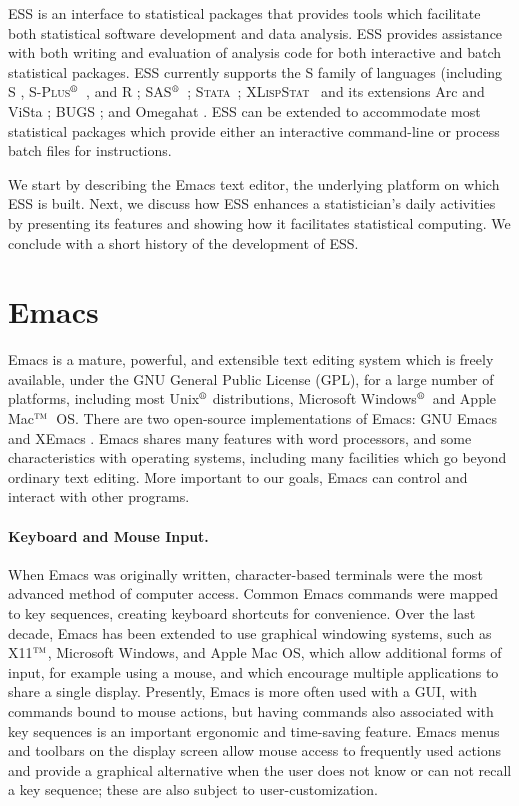 \documentclass{article}
\newcommand*{\regstrd}{$^{\mbox{\scriptsize{\textregistered}}}$}
\newcommand*{\tm}{$^{\mbox{\scriptsize\sc tm}}$}
\newcommand*{\SAS}{\textsc{SAS}}
\newcommand*{\Splus}{\textsc{S-Plus}}
\newcommand*{\XLispStat}{\textsc{XLispStat}}
\newcommand*{\Stata}{\textsc{Stata}}
\begin{document}
ESS is an interface to statistical packages that provides tools which
facilitate both statistical software development and data analysis.
ESS provides assistance with both writing and evaluation of analysis
code for both interactive and batch statistical packages.  ESS
currently supports the S family of languages (including S
\citep{BecRCW88,ChaJH92,ChaJ98}, \Splus\regstrd\ \citep{Splus}, and R
\citep{ihak:gent:1996,R}; \SAS\regstrd\ \citep{SAS:8}; \Stata\
\citep{Stata:7.0}; \XLispStat\ \citep{Tier90} and its extensions Arc
\citep{Cook:Weisberg:1999} and ViSta \citep{youn:fald:mcfa:1992}; BUGS
\citep{BUGS}; and Omegahat \citep{DTLang:2000}.  ESS can be extended
to accommodate most statistical packages which provide either an
interactive command-line or process batch files for instructions.

We start by describing the Emacs text editor, the underlying platform
on which ESS is built.  Next, we discuss how ESS enhances a
statistician's daily activities by presenting its features and showing
how it facilitates statistical computing.  We conclude with a short history
of the development of ESS.

\section{Emacs}
\label{sec:emacs}

Emacs is a mature, powerful, and extensible text editing system which
is freely available, under the GNU General Public License (GPL), for a
large number of platforms, including most Unix\regstrd
distributions, Microsoft Windows\regstrd\ and Apple Mac\tm\ OS.  There
are two open-source implementations of Emacs: GNU Emacs
\citep{GNU-Emacs} and XEmacs \citep{XEmacs}.  Emacs shares many
features with word processors, and some characteristics with operating
systems, including many facilities which go beyond ordinary text
editing.  More important to our goals, Emacs can control and interact
with other programs.

\paragraph{Keyboard and Mouse Input.}
When Emacs was originally written, character-based terminals were the
most advanced method of computer access.  Common Emacs commands were
mapped to key sequences, creating keyboard shortcuts for convenience.
Over the last decade, Emacs has been extended to use graphical
windowing systems, such as X11\tm, Microsoft Windows, and Apple Mac
OS, which allow additional forms of input, for example using a mouse,
and which encourage multiple applications to share a single display.
Presently, Emacs is more often used with a GUI, with commands bound to
mouse actions, but having commands also associated with key sequences
is an important ergonomic and time-saving feature.  Emacs menus and
toolbars on the display screen allow mouse access to frequently used
actions and provide a graphical alternative when the user does not
know or can not recall a key sequence; these are also subject to
user-customization.
\end{document}

